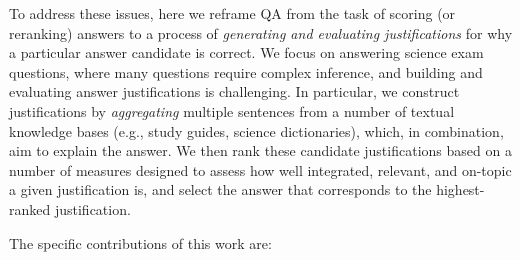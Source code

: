 
To address these issues, here we reframe QA from the task of scoring (or reranking) answers to 
a process of \emph{generating and evaluating justifications} for why a particular answer candidate is correct. 
We focus on answering science exam questions, where many questions require complex inference, and building and evaluating answer justifications is challenging. 
In particular, we construct justifications by {\em aggregating} multiple sentences from a number of textual knowledge bases (e.g., study guides, science dictionaries), which, in combination, aim to explain the answer.
We then rank these candidate justifications based on a number of measures designed to assess how well integrated, relevant, and on-topic a given justification is, and select the answer that corresponds to the highest-ranked justification.


The specific contributions of this work are: 

